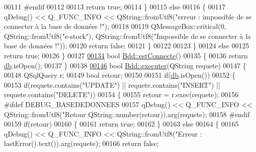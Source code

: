 \begin{DoxyCode}
{00111 \textcolor{preprocessor}{            #endif}
00112 
00113             \textcolor{keywordflow}{return} \textcolor{keyword}{true};
00114         \}
00115         \textcolor{keywordflow}{else}
00116         \{
00117             qDebug() << Q\_FUNC\_INFO << QString::fromUtf8(\textcolor{stringliteral}{"erreur : impossible de se connecter à la base de
       données !"});
00118 
00119             QMessageBox::critical(0, QString::fromUtf8(\textcolor{stringliteral}{"e-stock"}), QString::fromUtf8(\textcolor{stringliteral}{"Impossible de se
       connecter à la base de données !"}));
00120             \textcolor{keywordflow}{return} \textcolor{keyword}{false};
00121         \}
00122 
00123     \}
00124     \textcolor{keywordflow}{else}
00125         \textcolor{keywordflow}{return} \textcolor{keyword}{true};
00126 \}
00127 
\hyperlink{class_bdd_afeb7ee6793705cb94a94560fd53e3e9d}{00134} \textcolor{keywordtype}{bool} \hyperlink{class_bdd_afeb7ee6793705cb94a94560fd53e3e9d}{Bdd::estConnecte}()
00135 \{
00136     \textcolor{keywordflow}{return} \hyperlink{class_bdd_a8628c1686deda86999f86689c3e7268e}{db}.isOpen();
00137 \}
00138 
\hyperlink{class_bdd_ab6ae645b4b54ce5df8dc9b422fb39faa}{00146} \textcolor{keywordtype}{bool} \hyperlink{class_bdd_ab6ae645b4b54ce5df8dc9b422fb39faa}{Bdd::executer}(QString requete)
00147 \{
00148     QSqlQuery r;
00149     \textcolor{keywordtype}{bool} retour;
00150 
00151     \textcolor{keywordflow}{if}(\hyperlink{class_bdd_a8628c1686deda86999f86689c3e7268e}{db}.isOpen())
00152     \{
00153         \textcolor{keywordflow}{if}(requete.contains(\textcolor{stringliteral}{"UPDATE"}) || requete.contains(\textcolor{stringliteral}{"INSERT"}) || requete.contains(\textcolor{stringliteral}{"DELETE"}))
00154         \{
00155             retour = r.exec(requete);
00156 \textcolor{preprocessor}{            #ifdef DEBUG\_BASEDEDONNEES}
00157             qDebug() << Q\_FUNC\_INFO << QString::fromUtf8(\textcolor{stringliteral}{"Retour %
      QString::number(retour)).arg(requete);
00158 \textcolor{preprocessor}{            #endif}
00159             \textcolor{keywordflow}{if}(retour)
00160             \{
00161                 \textcolor{keywordflow}{return} \textcolor{keyword}{true};
00162             \}
00163             \textcolor{keywordflow}{else}
00164             \{
00165                 qDebug() << Q\_FUNC\_INFO << QString::fromUtf8(\textcolor{stringliteral}{"Erreur : %
      lastError().text()).arg(requete);
00166                 \textcolor{keywordflow}{return} \textcolor{keyword}{false};
}}}
\end{DoxyCode}
